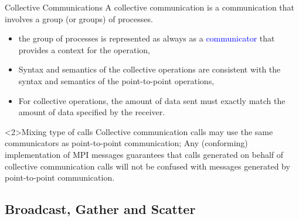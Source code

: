 \documentclass[xcolor={svgnames,usenames}]{beamer}
\begin{document}
\begin{frame}{Collective Communications}
	A \alert{collective communication} is a communication that involves a group (or groups) of
	processes.
	\begin{itemize}
		\item the group of processes is represented as always as a \textcolor{blue}{communicator} that provides a context for the operation,
		\item Syntax and semantics of the collective
		operations are consistent with the syntax and semantics of the point-to-point
		operations,
		\item For collective operations, the amount of data sent \alert{must exactly match} the amount of data specified by
		the receiver.
	\end{itemize}
	\vfill
	\begin{block}{Mixing type of calls}
	Collective communication calls may use the same communicators as point-to-point
	communication; Any (conforming) implementation of MPI messages guarantees that calls  generated on behalf of collective communication calls will not be confused with messages generated by point-to-point communication.
	\end{block}
\end{frame}

\subsection{Broadcast, Gather and Scatter}
\end{document}
